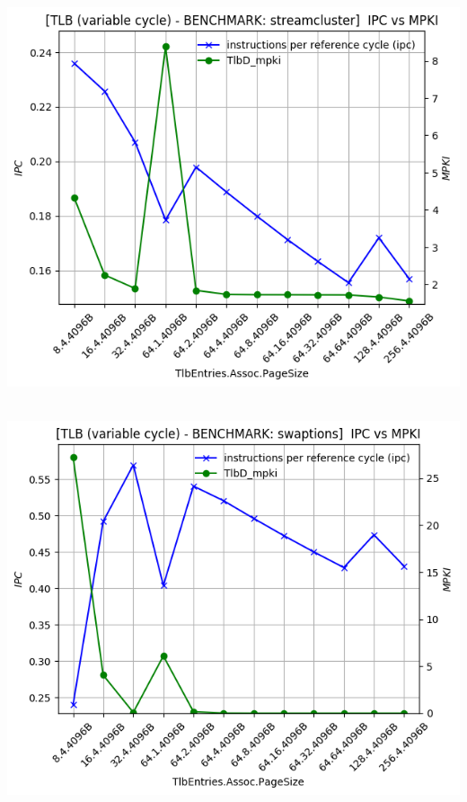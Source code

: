\begin{minipage}{\textwidth}
    \begin{center}
        \\
        \vspace{3mm}
        \includegraphics[scale=0.65]{graphs/TLB/var/streamcluster.png}
        \vspace{6mm}
    \end{center}
\end{minipage}

\begin{minipage}{\textwidth}
    \begin{center}
        \\
        \vspace{3mm}
        \includegraphics[scale=0.65]{graphs/TLB/var/swaptions.png}
        \vspace{6mm}
    \end{center}
\end{minipage}

